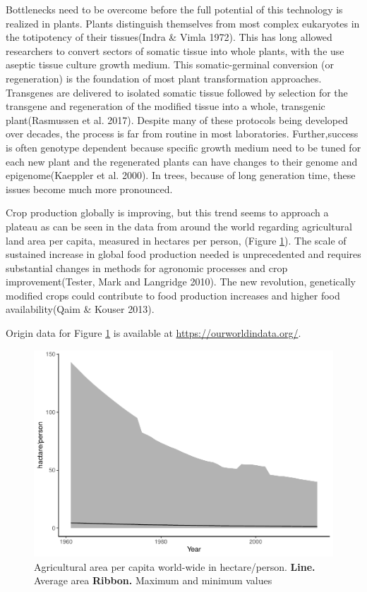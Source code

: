 \documentclass[
]{article}
\begin{document}
Bottlenecks need to be overcome before the full potential of this
technology is realized in plants. Plants distinguish themselves from
most complex eukaryotes in the totipotency of their tissues(Indra \&
Vimla 1972). This has long allowed researchers to convert sectors of
somatic tissue into whole plants, with the use aseptic tissue culture
growth medium. This somatic-germinal conversion (or regeneration) is the
foundation of most plant transformation approaches. Transgenes are
delivered to isolated somatic tissue followed by selection for the
transgene and regeneration of the modified tissue into a whole,
transgenic plant(Rasmussen et al. 2017). Despite many of these protocols
being developed over decades, the process is far from routine in most
laboratories. Further,success is often genotype dependent because
specific growth medium need to be tuned for each new plant and the
regenerated plants can have changes to their genome and
epigenome(Kaeppler et al. 2000). In trees, because of long generation
time, these issues become much more pronounced.

Crop production globally is improving, but this trend seems to approach
a plateau as can be seen in the data from around the world regarding
agricultural land area per capita, measured in hectares per person,
(Figure \ref{fig:agricultural area per capita}). The scale of sustained
increase in global food production needed is unprecedented and requires
substantial changes in methods for agronomic processes and crop
improvement(Tester, Mark and Langridge 2010). The new revolution,
genetically modified crops could contribute to food production increases
and higher food availability(Qaim \& Kouser 2013).

Origin data for Figure \ref{fig:agricultural area per capita} is
available at \url{https://ourworldindata.org/}.

\begin{figure}[h]

{\centering \includegraphics[width=0.7\linewidth]{Developing-noval-methods-for-gene-editing-in-trees_files/figure-latex/agricultural area per capita-1} 

}

\caption{Agricultural area per capita world-wide in hectare/person. \newline{} \textbf{Line.} Average area \textbf{Ribbon.} Maximum and minimum values}\label{fig:agricultural area per capita}
\end{figure}
\end{document}
